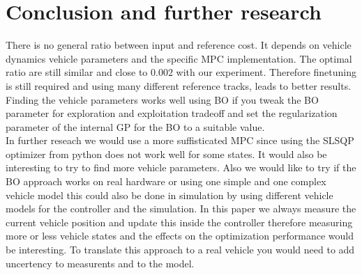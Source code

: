 \documentclass[twoside,twocolumn]{article}
\begin{document}
\section{Conclusion and further research}
There is no general ratio between input and reference cost. It depends on vehicle dynamics vehicle parameters and the specific MPC implementation. The optimal ratio are still similar and close to $0.002$ with our experiment. Therefore finetuning is still required and using many different reference tracks, leads to better results.\\

Finding the vehicle parameters works well using BO if you tweak the BO parameter for exploration and exploitation tradeoff and set the regularization parameter of the internal GP for the BO to a suitable value.\\

In further reseach we would use a more suffisticated MPC since using the SLSQP optimizer from python does not work well for some states. It would also be interesting to try to find more vehicle parameters. Also we would like to try if the BO approach works on real hardware or using one simple and one complex vehicle model this could also be done in simulation by using different vehicle models for the controller and the simulation. In this paper we always measure the current vehicle position and update this inside the controller therefore measuring more or less vehicle states and the effects on the optimization performance would be interesting. To translate this approach to a real vehicle you would need to add uncertency to measurents and to the model.



\end{document}
